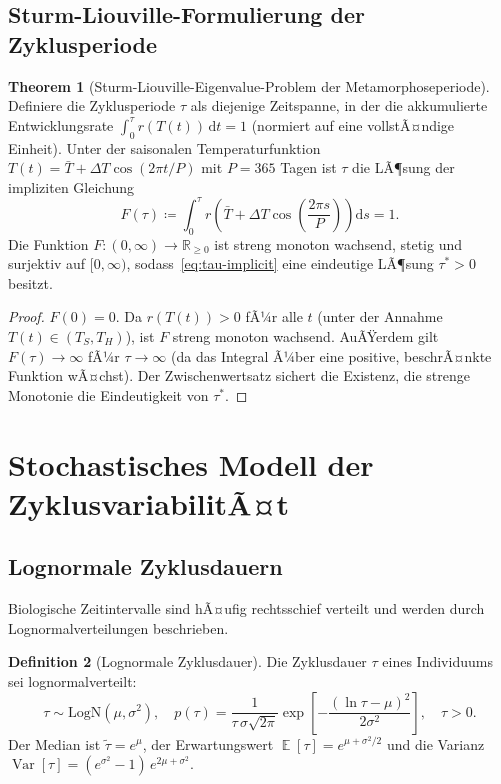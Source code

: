 ﻿\documentclass[12pt, a4paper]{article}
\theoremstyle{definition}
\newtheorem{theorem}{Theorem}[section]
\newtheorem{definition}[theorem]{Definition}
\DeclareMathOperator{\E}{\mathbb{E}}
\DeclareMathOperator{\Var}{Var}
\newcommand{\R}{\mathbb{R}}
\newcommand{\dd}{\mathrm{d}}
\begin{document}
\subsection{Sturm-Liouville-Formulierung der Zyklusperiode}

\begin{theorem}[Sturm-Liouville-Eigenvalue-Problem der Metamorphoseperiode]\label{thm:sturm-liouville}
Definiere die Zyklusperiode $\tau$ als diejenige Zeitspanne, in der die
akkumulierte Entwicklungsrate $\int_0^\tau r(T(t))\,\dd t = 1$ (normiert auf eine
vollstÃ¤ndige Einheit). Unter der saisonalen Temperaturfunktion
$T(t) = \bar{T} + \Delta T \cos(2\pi t / P)$ mit $P = 365$ Tagen ist $\tau$ die
LÃ¶sung der impliziten Gleichung
\begin{equation}\label{eq:tau-implicit}
  F(\tau) \coloneqq \int_0^\tau r\!\left(\bar{T} + \Delta T \cos\!\left(\frac{2\pi s}{P}\right)\right)\dd s = 1.
\end{equation}
Die Funktion $F: (0, \infty) \to \R_{\geq 0}$ ist streng monoton wachsend,
stetig und surjektiv auf $[0, \infty)$, sodass~\eqref{eq:tau-implicit} eine
eindeutige LÃ¶sung $\tau^* > 0$ besitzt.
\end{theorem}

\begin{proof}
$F(0) = 0$. Da $r(T(t)) > 0$ fÃ¼r alle $t$ (unter der Annahme $T(t) \in (T_S, T_H)$),
ist $F$ streng monoton wachsend. AuÃŸerdem gilt $F(\tau) \to \infty$ fÃ¼r
$\tau \to \infty$ (da das Integral Ã¼ber eine positive, beschrÃ¤nkte Funktion
wÃ¤chst). Der Zwischenwertsatz sichert die Existenz, die strenge Monotonie
die Eindeutigkeit von $\tau^*$. \hfill
\end{proof}

\section{Stochastisches Modell der ZyklusvariabilitÃ¤t}

\subsection{Lognormale Zyklusdauern}

Biologische Zeitintervalle sind hÃ¤ufig rechtsschief verteilt und werden durch
Lognormalverteilungen beschrieben.

\begin{definition}[Lognormale Zyklusdauer]\label{def:lognormal}
Die Zyklusdauer $\tau$ eines Individuums sei lognormalverteilt:
\[
  \tau \sim \mathrm{LogN}(\mu, \sigma^2), \quad
  p(\tau) = \frac{1}{\tau\,\sigma\sqrt{2\pi}}\exp\!\left[-\frac{(\ln\tau - \mu)^2}{2\sigma^2}\right],
  \quad \tau > 0.
\]
Der Median ist $\tilde{\tau} = e^\mu$, der Erwartungswert
$\E[\tau] = e^{\mu + \sigma^2/2}$ und die Varianz
$\Var[\tau] = (e^{\sigma^2} - 1)\,e^{2\mu+\sigma^2}$.
\end{definition}
\end{document}
